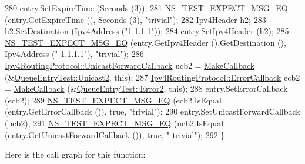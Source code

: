 \begin{DoxyCode}
280     entry.SetExpireTime (\hyperlink{group__timecivil_ga33c34b816f8ff6628e33d5c8e9713b9e}{Seconds} (3));
281     \hyperlink{group__testing_ga7304ba46a28d8cf08dfdfd6499cf7068}{NS\_TEST\_EXPECT\_MSG\_EQ} (entry.GetExpireTime (), \hyperlink{group__timecivil_ga33c34b816f8ff6628e33d5c8e9713b9e}{Seconds} (3), \textcolor{stringliteral}{"trivial"});
282     Ipv4Header h2;
283     h2.SetDestination (Ipv4Address (\textcolor{stringliteral}{"1.1.1.1"}));
284     entry.SetIpv4Header (h2);
285     \hyperlink{group__testing_ga7304ba46a28d8cf08dfdfd6499cf7068}{NS\_TEST\_EXPECT\_MSG\_EQ} (entry.GetIpv4Header ().GetDestination (), Ipv4Address (\textcolor{stringliteral}{"
      1.1.1.1"}), \textcolor{stringliteral}{"trivial"});
286     \hyperlink{classns3_1_1Ipv4RoutingProtocol_a3453a85764cbbb1e704da7e919aa5d19}{Ipv4RoutingProtocol::UnicastForwardCallback} ucb2 = 
      \hyperlink{group__makecallbackmemptr_ga9376283685aa99d204048d6a4b7610a4}{MakeCallback} (&\hyperlink{structns3_1_1aodv_1_1QueueEntryTest_a3dd406dc8d09fda9d8ba99ac20242cd9}{QueueEntryTest::Unicast2}, \textcolor{keyword}{this});
287     \hyperlink{classns3_1_1Ipv4RoutingProtocol_a0348285418c30d5021b08f7a68af21ea}{Ipv4RoutingProtocol::ErrorCallback} ecb2 = 
      \hyperlink{group__makecallbackmemptr_ga9376283685aa99d204048d6a4b7610a4}{MakeCallback} (&\hyperlink{structns3_1_1aodv_1_1QueueEntryTest_ac2f6a7eb4dfba2b865aed983a401b4df}{QueueEntryTest::Error2}, \textcolor{keyword}{this});
288     entry.SetErrorCallback (ecb2);
289     \hyperlink{group__testing_ga7304ba46a28d8cf08dfdfd6499cf7068}{NS\_TEST\_EXPECT\_MSG\_EQ} (ecb2.IsEqual (entry.GetErrorCallback ()), \textcolor{keyword}{true}, \textcolor{stringliteral}{"trivial"});
290     entry.SetUnicastForwardCallback (ucb2);
291     \hyperlink{group__testing_ga7304ba46a28d8cf08dfdfd6499cf7068}{NS\_TEST\_EXPECT\_MSG\_EQ} (ucb2.IsEqual (entry.GetUnicastForwardCallback ()), \textcolor{keyword}{true}, \textcolor{stringliteral}{"
      trivial"});
292   \}
\end{DoxyCode}


Here is the call graph for this function\+:


